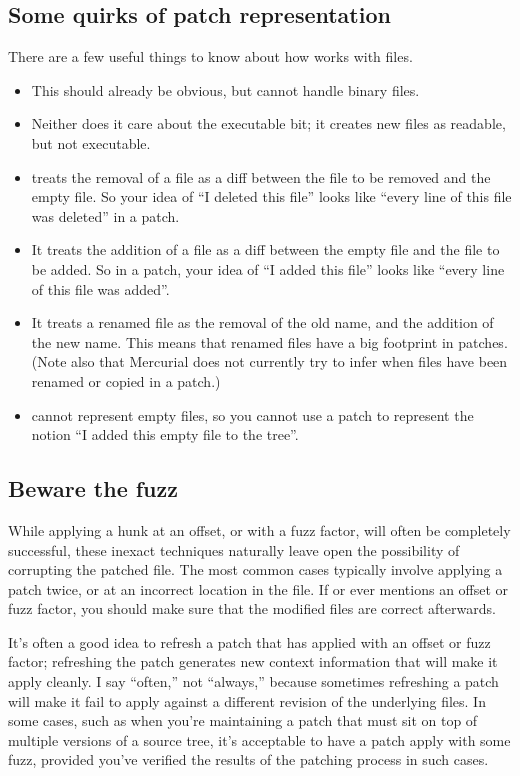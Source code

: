 \subsection{Some quirks of patch representation}

There are a few useful things to know about how  works
with files.
\begin{itemize}
\item This should already be obvious, but  cannot
  handle binary files.
\item Neither does it care about the executable bit; it creates new
  files as readable, but not executable.
\item {} treats the removal of a file as a diff between
  the file to be removed and the empty file.  So your idea of ``I
  deleted this file'' looks like ``every line of this file was
  deleted'' in a patch.
\item It treats the addition of a file as a diff between the empty
  file and the file to be added.  So in a patch, your idea of ``I
  added this file'' looks like ``every line of this file was added''.
\item It treats a renamed file as the removal of the old name, and the
  addition of the new name.  This means that renamed files have a big
  footprint in patches.  (Note also that Mercurial does not currently
  try to infer when files have been renamed or copied in a patch.)
\item {} cannot represent empty files, so you cannot use
  a patch to represent the notion ``I added this empty file to the
  tree''.
\end{itemize}
\subsection{Beware the fuzz}

While applying a hunk at an offset, or with a fuzz factor, will often
be completely successful, these inexact techniques naturally leave
open the possibility of corrupting the patched file.  The most common
cases typically involve applying a patch twice, or at an incorrect
location in the file.  If  or  ever
mentions an offset or fuzz factor, you should make sure that the
modified files are correct afterwards.  

It's often a good idea to refresh a patch that has applied with an
offset or fuzz factor; refreshing the patch generates new context
information that will make it apply cleanly.  I say ``often,'' not
``always,'' because sometimes refreshing a patch will make it fail to
apply against a different revision of the underlying files.  In some
cases, such as when you're maintaining a patch that must sit on top of
multiple versions of a source tree, it's acceptable to have a patch
apply with some fuzz, provided you've verified the results of the
patching process in such cases.

